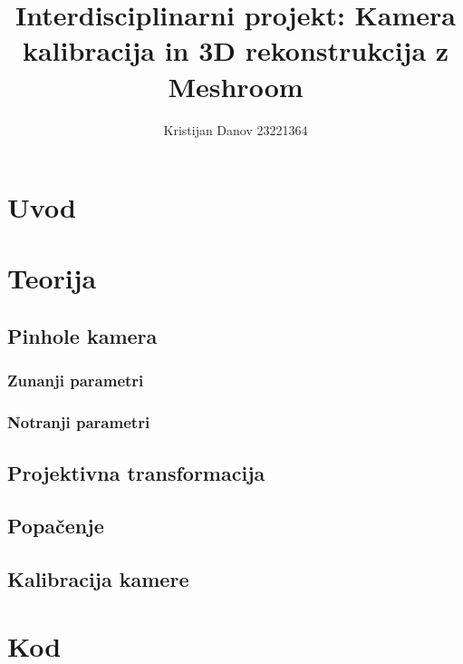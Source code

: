 \documentclass[12pt,a4paper,oneside,fleqn]{book}
\title{Interdisciplinarni projekt: Kamera kalibracija in 3D rekonstrukcija z Meshroom}
\author{Kristijan Danov 23221364}
\date{}
\begin{document}
\maketitle

\tableofcontents
\newpage

\chapter{Uvod}
    

\chapter{Teorija}
    

\section{Pinhole kamera}
    

    \subsection{Zunanji parametri}
        
    
    \subsection{Notranji parametri}
        

\section{Projektivna transformacija}
    

\section{Popačenje}
    

\section{Kalibracija kamere}
    


\chapter{Kod}
    
    
\end{document}
